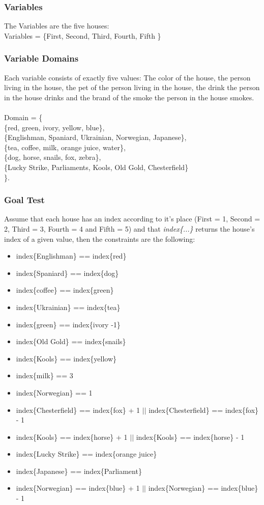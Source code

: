\documentclass[paper=a4, fontsize=11pt]{scrartcl} %
\numberwithin{equation}{section} %
\numberwithin{figure}{section} %
\numberwithin{table}{section} %
\begin{document}
\subsubsection{Variables}
The Variables are the five houses:\\
Variables = \{First, Second, Third, Fourth, Fifth \}
\subsubsection{Variable Domains}
Each variable consists of exactly five values: The color of the house, the person living in the house, the pet of the person living in the house, the drink the person in the house drinks and the brand of the smoke the person in the house smokes.\\\\
Domain = \{\\
\{red, green, ivory, yellow, blue\},\\
\{Englishman, Spaniard, Ukrainian, Norwegian, Japanese\},\\
\{tea, coffee, milk, orange juice, water\},\\
\{dog, horse, snails, fox, zebra\},\\
\{Lucky Strike, Parliaments, Kools, Old Gold, Chesterfield\}\\
\}.

\subsubsection{Goal Test}
Assume that each house has an index according to it's place (First = 1, Second = 2, Third = 3, Fourth = 4 and Fifth = 5) and that \textit{index\{...\}} returns the house's index of a given value, then the constraints are the following:
\begin{itemize}
\item index\{Englishman\} == index\{red\}
\item index\{Spaniard\} == index\{dog\}
\item index\{coffee\} == index\{green\}
\item index\{Ukrainian\} == index\{tea\}
\item index\{green\} == index\{ivory -1\}
\item index\{Old Gold\} == index\{snails\}
\item index\{Kools\} == index\{yellow\}
\item index\{milk\} == 3
\item index\{Norwegian\} == 1
\item index\{Chesterfield\} == index\{fox\} + 1 $\vert\vert$ index\{Chesterfield\} == index\{fox\} - 1
\item index\{Kools\} == index\{horse\} + 1 $\vert\vert$ index\{Kools\} == index\{horse\} - 1
\item index\{Lucky Strike\} == index\{orange juice\}
\item index\{Japanese\} == index\{Parliament\}
\item index\{Norwegian\} == index\{blue\} + 1 $\vert\vert$ index\{Norwegian\} == index\{blue\} - 1
\end{itemize}
\end{document}
